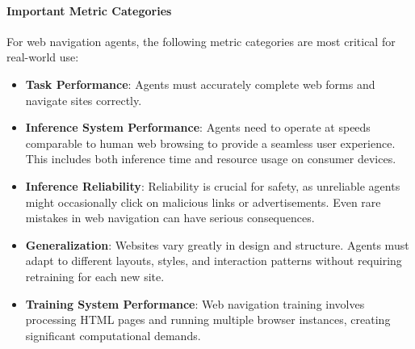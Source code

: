 \paragraph{Important Metric Categories}
For web navigation agents, the following metric categories are most critical for real-world use:
\begin{itemize}
    \item \textbf{Task Performance}: Agents must accurately complete web forms and navigate sites correctly. 
    
    \item \textbf{Inference System Performance}: Agents need to operate at speeds comparable to human web browsing to provide a seamless user experience. This includes both inference time and resource usage on consumer devices.
    
    \item \textbf{Inference Reliability}: Reliability is crucial for safety, as unreliable agents might occasionally click on malicious links or advertisements. Even rare mistakes in web navigation can have serious consequences.
    
    \item \textbf{Generalization}: Websites vary greatly in design and structure. Agents must adapt to different layouts, styles, and interaction patterns without requiring retraining for each new site.
    
    \item \textbf{Training System Performance}: Web navigation training involves processing HTML pages and running multiple browser instances, creating significant computational demands. 
\end{itemize}


